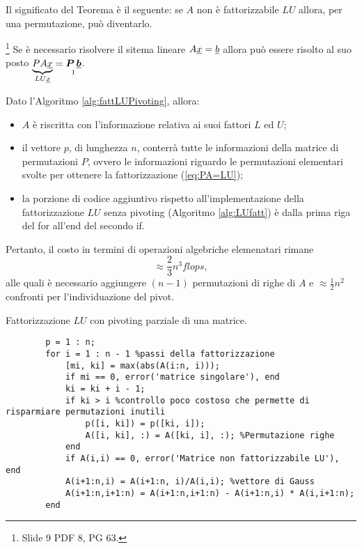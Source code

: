 Il significato del Teorema è il seguente: se $A$ non è fattorizzabile $LU$ allora, per una permutazione, può diventarlo.

\begin{remark}\footnote{Slide 9 PDF 8, PG 63.}
    Se è necessario risolvere il sitema lineare $A\uline x=\uline b $ allora può essere risolto al suo posto $\underbrace{PA\uline x}_{LU\uline x} = \underset{\footnotemark}{\boldsymbol{P\,\uline b}}$.
\end{remark}

Dato l'Algoritmo \ref{alg:fattLUPivoting}, allora:
\begin{itemize}
    \item $A$ è riscritta con l'informazione relativa ai suoi fattori $L$ ed $U$;
    \item il vettore $p$, di lunghezza $n$, conterrà tutte le informazioni della matrice di permutazioni $P$, ovvero le informazioni riguardo le permutazioni elementari svolte per ottenere la fattorizzazione (\ref{eq:PA=LU});
    \item la porzione di codice aggiuntivo rispetto all'implementazione della fattorizzazione $LU$ senza pivoting (Algoritmo \ref{alg:LUfatt}) è dalla prima riga del for all'end del secondo if.
\end{itemize}

Pertanto, il costo in termini di operazioni algebriche elemenatari rimane 
\begin{equation}\label{eq:costoFattLUPiv}
    \approx\frac{2}{3}n^3 flops,
\end{equation}
alle quali è necessario aggiungere $(n-1)$ permutazioni di righe di $A$ e $\approx\frac{1}{2}n^2$ confronti per l'individuazione del pivot. 

\begin{algorithm}
\caption{Fattorizzazione $LU$ con pivoting parziale di una matrice.}
\label{alg:fattLUPivoting}
    \begin{lstlisting}[style=Matlab-editor]
        %A n*n matrice da fattorizzare
        p = 1 : n;
        for i = 1 : n - 1 %passi della fattorizzazione
            [mi, ki] = max(abs(A(i:n, i)));
            if mi == 0, error('matrice singolare'), end
            ki = ki + i - 1;
            if ki > i %controllo poco costoso che permette di risparmiare permutazioni inutili
                p([i, ki]) = p([ki, i]);
                A([i, ki], :) = A([ki, i], :); %Permutazione righe
            end
            if A(i,i) == 0, error('Matrice non fattorizzabile LU'), end
            A(i+1:n,i) = A(i+1:n, i)/A(i,i); %vettore di Gauss
            A(i+1:n,i+1:n) = A(i+1:n,i+1:n) - A(i+1:n,i) * A(i,i+1:n);
        end
    \end{lstlisting}
\end{algorithm}

